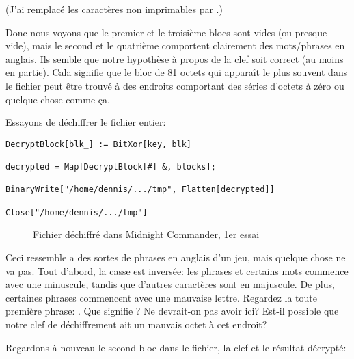 (J'ai remplacé les caractères non imprimables par .)

Donc nous voyons que le premier et le troisième blocs sont vides (ou presque vide),
mais le second et le quatrième comportent clairement des mots/phrases en anglais.
Ils semble que notre hypothèse à propos de la clef soit correct (au moins en partie).
Cala signifie que le bloc de 81 octets qui apparaît le plus souvent dans le fichier
peut être trouvé à des endroits comportant des séries d'octets à zéro ou quelque
chose comme ça.

Essayons de déchiffrer le fichier entier:

\begin{lstlisting}[style=custommath]
DecryptBlock[blk_] := BitXor[key, blk]

decrypted = Map[DecryptBlock[#] &, blocks];

BinaryWrite["/home/dennis/.../tmp", Flatten[decrypted]]

Close["/home/dennis/.../tmp"]
\end{lstlisting}

\begin{figure}[H]
\centering
{}
\caption{Fichier déchiffré dans Midnight Commander, 1er essai}
\end{figure}

Ceci ressemble a des sortes de phrases en anglais d'un jeu, mais quelque chose ne
va pas.
Tout d'abord, la casse est inversée: les phrases et certains mots commence avec une
minuscule, tandis que d'autres caractères sont en majuscule.
De plus, certaines phrases commencent avec une mauvaise lettre.
Regardez la toute première phrase: .
Que signifie ? Ne devrait-on pas avoir  ici?
Est-il possible que notre clef de déchiffrement ait un mauvais octet à cet endroit?

Regardons à nouveau le second bloc dans le fichier, la clef et le résultat décrypté:


